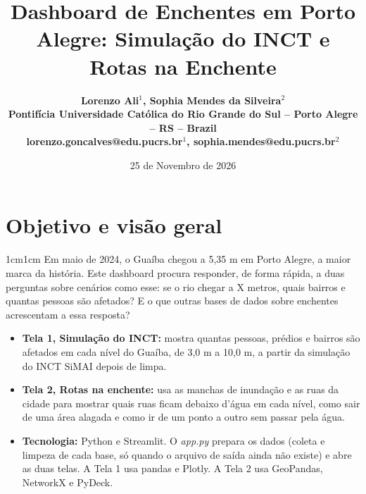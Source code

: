 \documentclass[12pt,a4paper]{article}
\title{Dashboard de Enchentes em Porto Alegre: Simulação do INCT e Rotas na Enchente}
\author{
    \small\bfseries
    Lorenzo Ali$^{1}$,
    Sophia Mendes da Silveira$^{2}$
    \\[0.3em]
    \small\normalfont
    Pontifícia Universidade Católica do Rio Grande do Sul --
    Porto Alegre -- RS -- Brazil
    \\[0.1em]
    \footnotesize\ttfamily
    lorenzo.goncalves@edu.pucrs.br$^{1}$,
    sophia.mendes@edu.pucrs.br$^{2}$
}
\date{\small 25 de Novembro de 2026}
\newcommand{\paragrafo}[1]{%
    \begin{adjustwidth}{1cm}{1cm}
        \indent\indent #1
    \end{adjustwidth}
}
\begin{document}
\maketitle

\section{Objetivo e visão geral}
    \paragrafo{Em maio de 2024, o Guaíba chegou a 5,35 m em Porto Alegre, a maior marca da história. Este dashboard procura responder, de forma rápida, a duas perguntas sobre cenários como esse: se o rio chegar a X metros, quais bairros e quantas pessoas são afetados? E o que outras bases de dados sobre enchentes acrescentam a essa resposta?}
    \begin{itemize}
        \item \textbf{Tela 1, Simulação do INCT:} mostra quantas pessoas, prédios e bairros são afetados em cada nível do Guaíba, de 3,0 m a 10,0 m, a partir da simulação do INCT SiMAI depois de limpa.
        \item \textbf{Tela 2, Rotas na enchente:} usa as manchas de inundação e as ruas da cidade para mostrar quais ruas ficam debaixo d'água em cada nível, como sair de uma área alagada e como ir de um ponto a outro sem passar pela água.
        \item \textbf{Tecnologia:} Python e Streamlit. O \textit{app.py} prepara os dados (coleta e limpeza de cada base, só quando o arquivo de saída ainda não existe) e abre as duas telas. A Tela 1 usa pandas e Plotly. A Tela 2 usa GeoPandas, NetworkX e PyDeck.
    \end{itemize}
\end{document}
